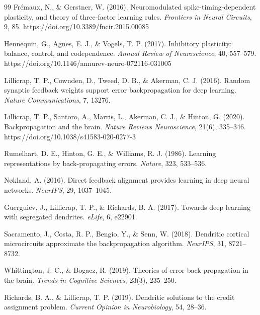 \begin{thebibliography}{99}
    Fr{\'e}maux, N., \& Gerstner, W. (2016).
    Neuromodulated spike-timing-dependent plasticity, and theory of three-factor learning rules.
    \emph{Frontiers in Neural Circuits}, 9, 85. https://doi.org/10.3389/fncir.2015.00085
    
    Hennequin, G., Agnes, E. J., \& Vogels, T. P. (2017).
    Inhibitory plasticity: balance, control, and codependence.
    \emph{Annual Review of Neuroscience}, 40, 557--579. https://doi.org/10.1146/annurev-neuro-072116-031005
    
    Lillicrap, T. P., Cownden, D., Tweed, D. B., \& Akerman, C. J. (2016).
    Random synaptic feedback weights support error backpropagation for deep learning.
    \emph{Nature Communications}, 7, 13276.
    
    Lillicrap, T. P., Santoro, A., Marris, L., Akerman, C. J., \& Hinton, G. (2020).
    Backpropagation and the brain.
    \emph{Nature Reviews Neuroscience}, 21(6), 335--346. https://doi.org/10.1038/s41583-020-0277-3
    
    Rumelhart, D. E., Hinton, G. E., \& Williams, R. J. (1986).
    Learning representations by back-propagating errors.
    \emph{Nature}, 323, 533--536.
    
    N{\o}kland, A. (2016).
    Direct feedback alignment provides learning in deep neural networks.
    \emph{NeurIPS}, 29, 1037--1045.
    
    Guerguiev, J., Lillicrap, T. P., \& Richards, B. A. (2017).
    Towards deep learning with segregated dendrites.
    \emph{eLife}, 6, e22901.
    
    Sacramento, J., Costa, R. P., Bengio, Y., \& Senn, W. (2018).
    Dendritic cortical microcircuits approximate the backpropagation algorithm.
    \emph{NeurIPS}, 31, 8721--8732.
    
    Whittington, J. C., \& Bogacz, R. (2019).
    Theories of error back-propagation in the brain.
    \emph{Trends in Cognitive Sciences}, 23(3), 235--250.
    
    Richards, B. A., \& Lillicrap, T. P. (2019).
    Dendritic solutions to the credit assignment problem.
    \emph{Current Opinion in Neurobiology}, 54, 28--36.
    

\end{thebibliography}
